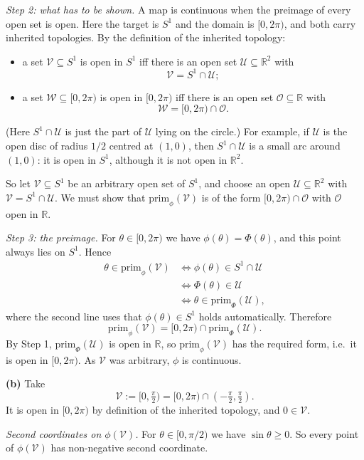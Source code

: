 \documentclass[11pt]{article}
\newcommand{\prim}[1]{\mathrm{prim}_{#1}}
\begin{document}
\emph{Step 2: what has to be shown.} A map is continuous when the preimage of every open set is open. Here the target is $S^1$ and the domain is $[0,2\pi)$, and both carry inherited topologies. By the definition of the inherited topology:
\begin{itemize}
  \item a set $\mathcal V\subseteq S^1$ is open in $S^1$ iff there is an open set $\mathcal U\subseteq\mathbb R^2$ with
  \[
  \mathcal V=S^1\cap\mathcal U;
  \]
  \item a set $\mathcal W\subseteq[0,2\pi)$ is open in $[0,2\pi)$ iff there is an open set $\mathcal O\subseteq\mathbb R$ with
  \[
  \mathcal W=[0,2\pi)\cap\mathcal O.
  \]
\end{itemize}
(Here $S^1\cap\mathcal U$ is just the part of $\mathcal U$ lying on the circle.) For example, if $\mathcal U$ is the open disc of radius $1/2$ centred at $(1,0)$, then $S^1\cap\mathcal U$ is a small arc around $(1,0)$: it is open in $S^1$, although it is not open in $\mathbb R^2$.

So let $\mathcal V\subseteq S^1$ be an arbitrary open set of $S^1$, and choose an open $\mathcal U\subseteq\mathbb R^2$ with $\mathcal V=S^1\cap\mathcal U$. We must show that $\prim{\phi}(\mathcal V)$ is of the form $[0,2\pi)\cap\mathcal O$ with $\mathcal O$ open in $\mathbb R$.

\emph{Step 3: the preimage.} For $\theta\in[0,2\pi)$ we have $\phi(\theta)=\Phi(\theta)$, and this point always lies on $S^1$. Hence
\begin{align*}
\theta\in\prim{\phi}(\mathcal V)
&\iff\phi(\theta)\in S^1\cap\mathcal U\\
&\iff\Phi(\theta)\in\mathcal U\\
&\iff\theta\in\prim{\Phi}(\mathcal U),
\end{align*}
where the second line uses that $\phi(\theta)\in S^1$ holds automatically. Therefore
\[
\prim{\phi}(\mathcal V)=[0,2\pi)\cap\prim{\Phi}(\mathcal U).
\]
By Step 1, $\prim{\Phi}(\mathcal U)$ is open in $\mathbb R$, so $\prim{\phi}(\mathcal V)$ has the required form, i.e.\ it is open in $[0,2\pi)$. As $\mathcal V$ was arbitrary, $\phi$ is continuous.

\textbf{(b)} Take
\[
\mathcal V:=[0,\tfrac\pi2)=[0,2\pi)\cap(-\tfrac\pi2,\tfrac\pi2).
\]
It is open in $[0,2\pi)$ by definition of the inherited topology, and $0\in\mathcal V$.

\emph{Second coordinates on $\phi(\mathcal V)$.} For $\theta\in[0,\pi/2)$ we have $\sin\theta\ge0$. So every point of $\phi(\mathcal V)$ has non-negative second coordinate.
\end{document}
